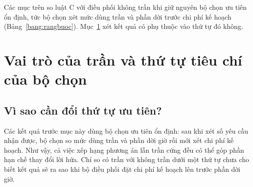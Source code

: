 
Các mục trên so luật C với điều phối không trần khi giữ nguyên bộ chọn ưu tiên ổn định, tức bộ chọn xét mức dùng trần
và phần dời trước chi phí kế hoạch (Bảng~\ref{bang:rangbuoc}). Mục~\ref{muc:c4-vaitro} xét kết quả có phụ thuộc vào
thứ tự đó không.


\section{Vai trò của trần và thứ tự tiêu chí của bộ chọn}
\label{muc:c4-vaitro}

\subsection{Vì sao cần đổi thứ tự ưu tiên?}

Các kết quả trước mục này dùng bộ chọn ưu tiên ổn định: sau khi xét số yêu cầu nhận được, bộ chọn so mức dùng
trần và phần dời giờ rồi mới xét chi phí kế hoạch. Như vậy, cả việc xếp hạng phương án lẫn trần cứng đều có thể
góp phần hạn chế thay đổi lời hứa. Chỉ so có trần với không trần dưới một thứ tự chưa cho biết kết quả sẽ ra sao
khi bộ điều phối đặt chi phí kế hoạch lên trước phần dời giờ.

